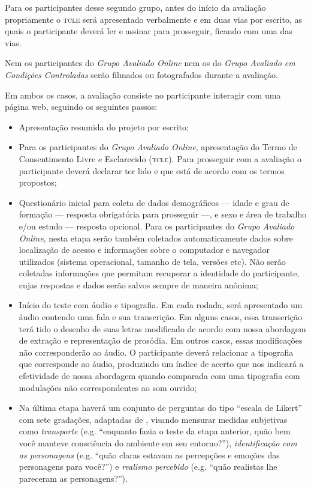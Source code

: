 \documentclass[a4paper,11pt,titlepage,singlespacing]{article}
\begin{document}
Para os participantes desse segundo grupo, antes do início da avaliação propriamente o \textsc{tcle} será apresentado verbalmente e em duas vias por escrito, as quais o participante deverá ler e assinar para prosseguir, ficando com uma das vias.

Nem os participantes do \textit{Grupo Avaliado Online} nem os do \textit{Grupo Avaliado em Condições Controladas} serão filmados ou fotografados durante a avaliação.

Em ambos os casos, a avaliação consiste no participante interagir com uma página web, seguindo os seguintes passos:

\begin{itemize}
    \item Apresentação resumida do projeto por escrito;
    \item Para os participantes do \textit{Grupo Avaliado Online}, apresentação do Termo de Consentimento Livre e Esclarecido (\textsc{tcle}). Para prosseguir com a avaliação o participante deverá declarar ter lido e que está de acordo com os termos propostos;
    \item Questionário inicial para coleta de dados demográficos — idade e grau de formação — resposta obrigatória para prosseguir —, e sexo e área de trabalho e/ou estudo — resposta opcional. Para os participantes do \textit{Grupo Avaliado Online}, nesta etapa serão também coletados automaticamente dados sobre localização de acesso e informações sobre o computador e navegador utilizados (sistema operacional, tamanho de tela, versões etc). Não serão coletadas informações que permitam recuperar a identidade do participante, cujas respostas e dados serão salvos sempre de maneira anônima; 
    \item Início do teste com áudio e tipografia. Em cada rodada, será apresentado um áudio contendo uma fala e sua transcrição. Em alguns casos, essa transcrição terá tido o desenho de suas letras modificado de acordo com nossa abordagem de extração e representação de prosódia. Em outros casos, essas modificações não corresponderão ao áudio. O participante deverá relacionar a tipografia que corresponde ao áudio, produzindo um índice de acerto que nos indicará a efetividade de nossa abordagem quando comparada com uma tipografia com modulações não correspondentes ao som ouvido;
    \item Na última etapa haverá um conjunto de perguntas do tipo ``escala de Likert'' com sete gradações, adaptadas de , visando mensurar medidas subjetivas como \textit{transporte} (e.g. “enquanto fazia o teste da etapa anterior, quão bem você manteve consciência do ambiente em seu entorno?”), \textit{identificação com as personagens} (e.g. “quão claras estavam as percepções e emoções das personagens para você?”) e \textit{realismo percebido} (e.g. “quão realistas lhe pareceram as personagens?”). 
\end{itemize}
\end{document}
